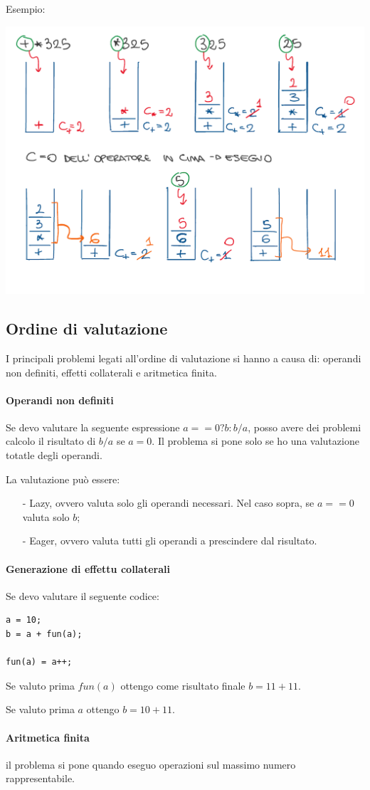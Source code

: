 \documentclass[a4paper, 10pt]{report}
\begin{document}
\noindent Esempio:
\begin{center}
\includegraphics[scale=0.65]{esempio2.pdf}
\end{center}

\subsection*{Ordine di valutazione}
I principali problemi legati all'ordine di valutazione si hanno a causa di: operandi non definiti, effetti collaterali e aritmetica finita.

\paragraph*{Operandi non definiti} Se devo valutare la seguente espressione $a == 0 ? b : b/a$, posso avere dei problemi calcolo il risultato di $b/a$ se $a = 0$. Il problema si pone solo se ho una valutazione totatle degli operandi. 

La valutazione può essere:
\begin{itemize}
\item[-] Lazy, ovvero valuta solo gli operandi necessari. Nel caso sopra, se $a == 0$ valuta solo $b$;
\item[-] Eager, ovvero valuta tutti gli operandi a prescindere dal risultato.
\end{itemize}

\paragraph*{Generazione di effettu collaterali} Se devo valutare il seguente codice:
\begin{lstlisting}
a = 10;
b = a + fun(a);

fun(a) = a++;
\end{lstlisting}

\noindent Se valuto prima $fun(a)$ ottengo come risultato finale $b = 11 + 11$.

\noindent Se valuto prima $a$ ottengo $b = 10 + 11$.

\paragraph*{Aritmetica finita} il problema si pone quando eseguo operazioni sul massimo numero rappresentabile.
\end{document}
